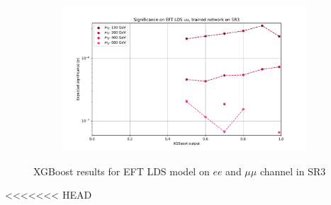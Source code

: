 \documentclass[12pt, a4paper]{book}
\begin{document}
\begin{figure}[!ht]
\begin{subfigure}[b]{0.49\textwidth}
   \end{subfigure}
   \hfill
   \begin{subfigure}[b]{0.49\textwidth}
      \centering
      \includegraphics[width=1\textwidth]{XGBoost/Model_independent/150/EFT_LDS/EXP_SIG_uu.pdf}
   \end{subfigure}
   \caption{XGBoost results for EFT LDS model on $ee$ and $\mu\mu$ channel in SR3}\label{fig:EFT_LDS_SR3}
\end{figure}
<<<<<<< HEAD
\end{document}
